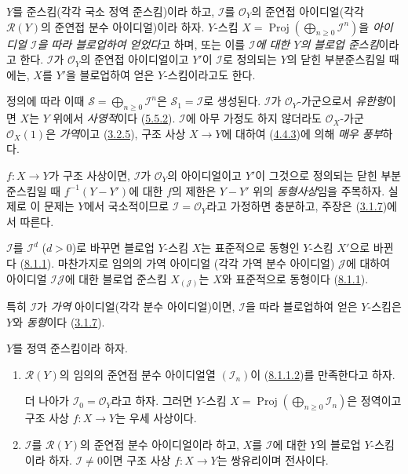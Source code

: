 \begin{definition}[8.1.3]
\label{II.8.1.3-ko}
$Y$를 준스킴(각각 국소 정역 준스킴)이라 하고, $\mathcal{I}$를
$\mathcal{O}_Y$의 준연접 아이디얼(각각 $\mathcal{R}(Y)$의 준연접 분수
아이디얼)이라 하자. $Y$-스킴
$X=\operatorname{Proj}(\bigoplus_{n\geq0}\mathcal{I}^n)$을
\emph{아이디얼 $\mathcal{I}$을 따라 블로업하여 얻었다}고 하며, 또는
이를 \emph{$\mathcal{I}$에 대한 $Y$의 블로업 준스킴}이라고 한다.
$\mathcal{I}$가 $\mathcal{O}_Y$의 준연접 아이디얼이고 $Y'$이
$\mathcal{I}$로 정의되는 $Y$의 닫힌 부분준스킴일 때에는, $X$를
$Y'$을 블로업하여 얻은 $Y$-스킴이라고도 한다.
\end{definition}

정의에 따라 이때
$\mathcal{S}=\bigoplus_{n\geq0}\mathcal{I}^n$은
$\mathcal{S}_1=\mathcal{I}$로 생성된다. $\mathcal{I}$가 
$\mathcal{O}_Y$-가군으로서 \emph{유한형}이면 $X$는 $Y$ 위에서
\emph{사영적}이다 (\hyperref[II.5.5.2-ko]{5.5.2}). $\mathcal{I}$에
아무 가정도 하지 않더라도 $\mathcal{O}_X$-가군 $\mathcal{O}_X(1)$은
\emph{가역}이고 (\hyperref[II.3.2.5-ko]{3.2.5}), 구조 사상
$X\to Y$에 대하여 (\hyperref[II.4.4.3-ko]{4.4.3})에 의해
\emph{매우 풍부}하다.

$f:X\to Y$가 구조 사상이면, $\mathcal{I}$가 $\mathcal{O}_Y$의
아이디얼이고 $Y'$이 그것으로 정의되는 닫힌 부분준스킴일 때
$f^{-1}(Y-Y')$에 대한 $f$의 제한은 $Y-Y'$ 위의
\emph{동형사상}임을 주목하자. 실제로 이 문제는 $Y$에서 국소적이므로
$\mathcal{I}=\mathcal{O}_Y$라고 가정하면 충분하고, 주장은
(\hyperref[II.3.1.7-ko]{3.1.7})에서 따른다.

$\mathcal{I}$를 $\mathcal{I}^d$ ($d>0$)로 바꾸면 블로업 $Y$-스킴
$X$는 표준적으로 동형인 $Y$-스킴 $X'$으로 바뀐다
(\hyperref[II.8.1.1-ko]{8.1.1}). 마찬가지로 임의의 가역 아이디얼
(각각 가역 분수 아이디얼) $\mathcal{J}$에 대하여 아이디얼
$\mathcal{I}\mathcal{J}$에 대한 블로업 준스킴
$X_{(\mathcal{J})}$는 $X$와 표준적으로 동형이다
(\hyperref[II.8.1.1-ko]{8.1.1}).

특히 $\mathcal{I}$가 \emph{가역} 아이디얼(각각 분수 아이디얼)이면,
$\mathcal{I}$을 따라 블로업하여 얻은 $Y$-스킴은 $Y$와
\emph{동형}이다 (\hyperref[II.3.1.7-ko]{3.1.7}).

\begin{proposition}[8.1.4]
\label{II.8.1.4-ko}
$Y$를 정역 준스킴이라 하자.
\begin{enumerate}
\item[\rm(i)] $\mathcal{R}(Y)$의 임의의 준연접 분수 아이디얼열
$(\mathcal{I}_n)$이 (\hyperref[II.8.1.1.2-ko]{8.1.1.2})를
만족한다고 하자.

더 나아가 $\mathcal{I}_0=\mathcal{O}_Y$라고 하자. 그러면 $Y$-스킴
$X=\operatorname{Proj}(\bigoplus_{n\geq0}\mathcal{I}_n)$은
정역이고 구조 사상 $f:X\to Y$는 우세 사상이다.
\item[\rm(ii)] $\mathcal{I}$를 $\mathcal{R}(Y)$의 준연접 분수
아이디얼이라 하고, $X$를 $\mathcal{I}$에 대한 $Y$의 블로업
$Y$-스킴이라 하자. $\mathcal{I}\neq0$이면 구조 사상 $f:X\to Y$는
쌍유리이며 전사이다.
\end{enumerate}
\end{proposition}

